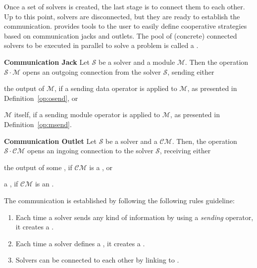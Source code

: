 Once a set of solvers is created, the last stage is to connect them to each other. Up to this point, solvers are disconnected, but they are ready to establish the communication. \posl{} provides tools  to the user to easily define cooperative strategies based on communication jacks and outlets. The pool of (concrete) connected solvers to be executed in parallel to solve a problem is called a \INTROsoset{}. 


\begin{definition}\label{def:comm_jack}
{\bf Communication Jack} Let $\mathcal{S}$ be a solver and a module $\mathcal{M}$. Then the operation $\mathcal{S}\cdot\mathcal{M}$ opens an outgoing connection from the solver $\mathcal{S}$, sending either 
\begin{inparaenum}[a)]
	\item the output of $\mathcal{M}$, if a sending data operator is applied to $\mathcal{M}$, as presented in Definition~\ref{op:osend}, or
	\item $\mathcal{M}$ itself, if a sending module operator is applied to $\mathcal{M}$, as presented in Definition~\ref{op:msend}.
\end{inparaenum}
\end{definition} 

\begin{definition}\label{def:comm_outlet}
{\bf Communication Outlet} Let $\mathcal{S}$ be a solver and a \opch{} $\mathcal{CM}$. Then, the operation $\mathcal{S}\cdot\mathcal{CM}$ opens an ingoing connection to the solver $\mathcal{S}$, receiving either 
\begin{inparaenum}[a)]
	\item the output of some \om{}, if $\mathcal{CM}$ is a \dopch{}, or
	\item a \om{}, if $\mathcal{CM}$ is an \oopch.
\end{inparaenum}
\end{definition} 

\separation

The communication is established by following the following rules guideline:
\begin{enumerate}%
	\item Each time a solver sends any kind of information by using a {\it sending} operator, it creates a \INTROjack.
	\item Each time a solver defines a \opch, it creates a \INTROoutlet. 
	\item Solvers can be connected to each other by linking \jacks{} to \outlets.
\end{enumerate} %

